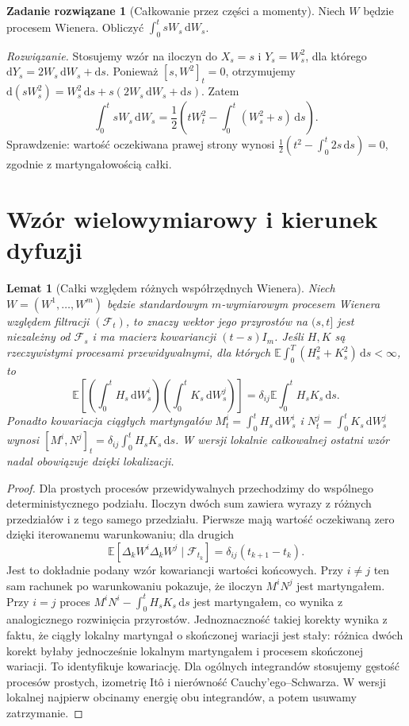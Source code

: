 \documentclass[11pt,a4paper,oneside]{report}
\numberwithin{equation}{chapter}
\theoremstyle{plain}
\newtheorem{lemat}[twierdzenie]{Lemat}
\theoremstyle{definition}
\newtheorem{zadanie}{Zadanie rozwiązane}[chapter]
\theoremstyle{remark}
\newcommand{\E}{\mathbb{E}}
\newcommand{\calF}{\mathcal{F}}
\newcommand{\dd}{\mathrm{d}}
\begin{document}
\begin{zadanie}[Całkowanie przez części a momenty]
Niech $W$ będzie procesem Wienera. Obliczyć
$\int_0^t sW_s\,\dd W_s$.

\emph{Rozwiązanie.} Stosujemy wzór na iloczyn do
$X_s=s$ i $Y_s=W_s^2$, dla którego
$\dd Y_s=2W_s\,\dd W_s+\dd s$.
Ponieważ $[s,W^2]_t=0$, otrzymujemy
$\dd(sW_s^2)=W_s^2\,\dd s+s(2W_s\,\dd W_s+\dd s)$.
Zatem
\[
\int_0^t sW_s\,\dd W_s
=\frac12\left(tW_t^2-\int_0^t(W_s^2+s)\,\dd s\right).
\]
Sprawdzenie: wartość oczekiwana prawej strony wynosi
$\frac12(t^2-\int_0^t2s\,\dd s)=0$, zgodnie z
martyngałowością całki.
\end{zadanie}

\section{Wzór wielowymiarowy i kierunek dyfuzji}\label{sec:volIII:03:06}
\begin{lemat}[Całki względem różnych współrzędnych Wienera]\label{lem:volIII:03:03}
\label{lem:multi-orthogonality}
Niech $W=(W^1,\ldots,W^m)$ będzie standardowym
$m$-wymiarowym procesem Wienera względem filtracji
$(\calF_t)$, to znaczy wektor jego przyrostów na
$(s,t]$ jest niezależny od $\calF_s$ i ma macierz
kowariancji $(t-s)I_m$. Jeśli $H,K$ są rzeczywistymi
procesami przewidywalnymi, dla których
$\E\int_0^T(H_s^2+K_s^2)\,\dd s<\infty$, to
\[
\E\left[
\left(\int_0^tH_s\,\dd W_s^i\right)
\left(\int_0^tK_s\,\dd W_s^j\right)\right]
=\delta_{ij}\E\int_0^tH_sK_s\,\dd s.
\]
Ponadto kowariacja ciągłych martyngałów
$M_t^i=\int_0^t H_s\,\dd W_s^i$ i
$N_t^j=\int_0^t K_s\,\dd W_s^j$ wynosi
$[M^i,N^j]_t=\delta_{ij}\int_0^tH_sK_s\,\dd s$.
W wersji lokalnie całkowalnej ostatni wzór nadal
obowiązuje dzięki lokalizacji.
\end{lemat}
\begin{proof}
Dla prostych procesów przewidywalnych przechodzimy do
wspólnego deterministycznego podziału. Iloczyn dwóch
sum zawiera wyrazy z różnych przedziałów i z tego
samego przedziału. Pierwsze mają wartość oczekiwaną
zero dzięki iterowanemu warunkowaniu; dla drugich
\[
\E[\Delta_kW^i\Delta_kW^j\mid\calF_{t_k}]
=\delta_{ij}(t_{k+1}-t_k).
\]
Jest to dokładnie podany wzór kowariancji wartości
końcowych. Przy $i\ne j$ ten sam rachunek po
warunkowaniu pokazuje, że iloczyn $M^iN^j$ jest
martyngałem. Przy $i=j$ proces
$M^iN^i-\int_0^t H_sK_s\,\dd s$ jest martyngałem,
co wynika z analogicznego rozwinięcia przyrostów.
Jednoznaczność takiej korekty wynika z faktu, że
ciągły lokalny martyngał o skończonej wariacji jest
stały: różnica dwóch korekt byłaby jednocześnie
lokalnym martyngałem i procesem skończonej wariacji.
To identyfikuje kowariację.
Dla ogólnych integrandów stosujemy gęstość procesów
prostych, izometrię Itô i nierówność Cauchy'ego--Schwarza.
W wersji lokalnej najpierw obcinamy energię obu
integrandów, a potem usuwamy zatrzymanie.
\end{proof}
\end{document}
